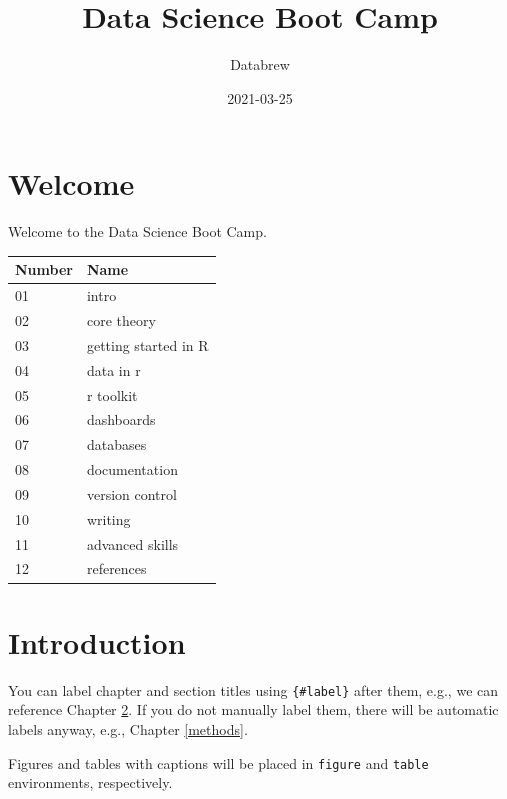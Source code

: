 \documentclass[
]{book}
\title{Data Science Boot Camp}
\author{Databrew}
\date{2021-03-25}
\begin{document}
\maketitle

{
\setcounter{tocdepth}{1}
\tableofcontents
}
\hypertarget{welcome}{%
\chapter{Welcome}\label{welcome}}

Welcome to the Data Science Boot Camp.

\begin{tabular}{l|l}
\hline
Number & Name\\
\hline
01 & intro\\
\hline
02 & core theory\\
\hline
03 & getting started in R\\
\hline
04 & data in r\\
\hline
05 & r toolkit\\
\hline
06 & dashboards\\
\hline
07 & databases\\
\hline
08 & documentation\\
\hline
09 & version control\\
\hline
10 & writing\\
\hline
11 & advanced skills\\
\hline
12 & references\\
\hline
\end{tabular}

\hypertarget{intro}{%
\chapter{Introduction}\label{intro}}

You can label chapter and section titles using \texttt{\{\#label\}} after them, e.g., we can reference Chapter \ref{intro}. If you do not manually label them, there will be automatic labels anyway, e.g., Chapter \ref{methods}.

Figures and tables with captions will be placed in \texttt{figure} and \texttt{table} environments, respectively.
\end{document}
